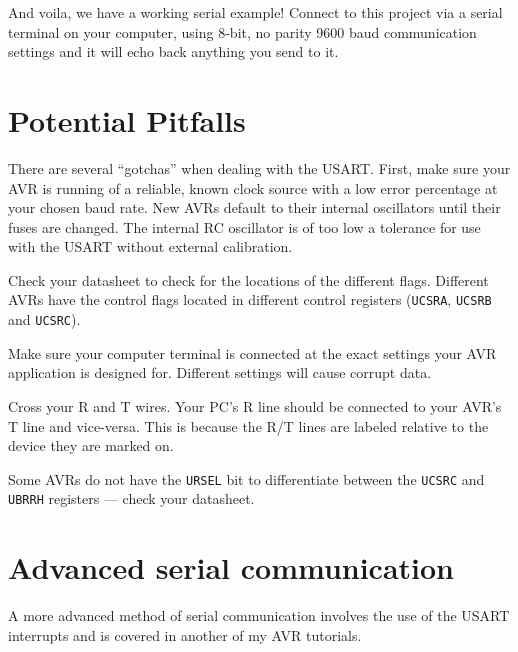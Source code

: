 \documentclass[a4paper,oneside,notitlepage]{book}
\begin{document}
And voila, we have a working serial example! Connect to this project via a serial terminal on your computer, using 8-bit, no parity 9600 baud communication settings and it will echo back anything you send to it.


\chapter{Potential Pitfalls}

There are several ``gotchas'' when dealing with the USART. First, make sure your AVR is running of a reliable, known clock source with a low error percentage at your chosen baud rate. New AVRs default to their internal oscillators until their fuses are changed. The internal RC oscillator is of too low a tolerance for use with the USART without external calibration.

Check your datasheet to check for the locations of the different flags. Different AVRs have the control flags located in different control registers (\texttt{UCSRA}, \texttt{UCSRB} and \texttt{UCSRC}).

Make sure your computer terminal is connected at the exact settings your AVR application is designed for. Different settings will cause corrupt data.

Cross your R and T wires. Your PC's R line should be connected to your AVR's T line and vice-versa. This is because the R/T lines are labeled relative to the device they are marked on.

Some AVRs do not have the \texttt{URSEL} bit to differentiate between the \texttt{UCSRC} and \texttt{UBRRH} registers --- check your datasheet.


\chapter{Advanced serial communication}

A more advanced method of serial communication involves the use of the USART interrupts and is covered in another of my AVR tutorials.
\end{document}
